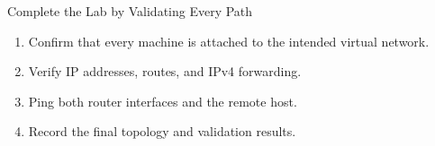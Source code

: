 \begin{frame}{Complete the Lab by Validating Every Path}
  \begin{enumerate}
    \item Confirm that every machine is attached to the intended virtual network.
    \item Verify IP addresses, routes, and IPv4 forwarding.
    \item Ping both router interfaces and the remote host.
    \item Record the final topology and validation results.
  \end{enumerate}
\end{frame}
